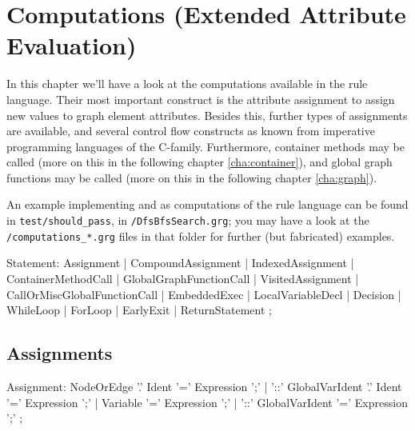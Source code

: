 \chapter{Computations (Extended Attribute Evaluation)}
\label{cha:computations}

In this chapter we'll have a look at the computations available in the rule language.
Their most important construct is the attribute assignment to assign new values to graph element attributes.
Besides this, further types of assignments are available, and several control flow constructs as known from imperative programming languages of the C-family.
Furthermore, container methods may be called (more on this in the following chapter \ref{cha:container}), 
and global graph functions may be called (more on this in the following chapter \ref{cha:graph}).

An example implementing  and  as computations of the rule language can be found in \texttt{test/should\_pass}, in \texttt{/DfsBfsSearch.grg}; you may have a look at the \verb#/computations_*.grg# files in that folder for further (but fabricated) examples.

\begin{rail}
  Statement:
      Assignment
    | CompoundAssignment
    | IndexedAssignment
    | ContainerMethodCall
    | GlobalGraphFunctionCall
    | VisitedAssignment
    | CallOrMiscGlobalFunctionCall
    | EmbeddedExec
    | LocalVariableDecl
    | Decision
    | WhileLoop
    | ForLoop
    | EarlyExit
    | ReturnStatement
    ;
\end{rail}\label{computationstatemet}



\section{Assignments} \label{sub:assignments}

\begin{rail}
  Assignment:
	  NodeOrEdge '.' Ident '=' Expression ';' |
	  '::' GlobalVarIdent '.' Ident '=' Expression ';' |
	  Variable '=' Expression ';' |
	  '::' GlobalVarIdent '=' Expression ';'
	;
\end{rail}

